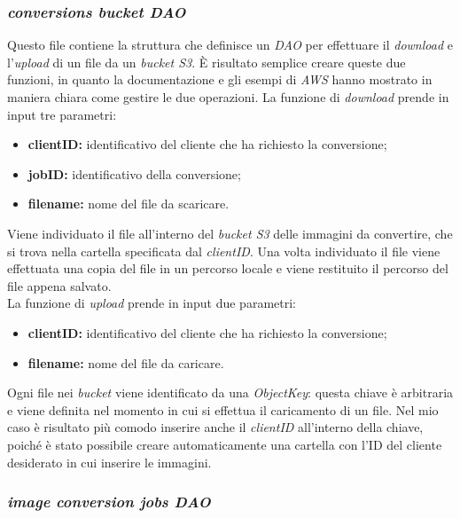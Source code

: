 \subsubsection{\emph{conversions bucket DAO}}

Questo file contiene la struttura che definisce un \emph{DAO} per effettuare il
\emph{download} e l'\emph{upload} di un file da un \emph{bucket S3}. È risultato
semplice creare queste due funzioni, in quanto la documentazione e gli esempi di
\emph{AWS} hanno mostrato in maniera chiara come gestire le due operazioni. La funzione
di \emph{download} prende in input tre parametri:
\begin{itemize}
      \item \textbf{clientID:} identificativo del cliente che ha richiesto la
            conversione;
      \item \textbf{jobID:} identificativo della conversione;
      \item \textbf{filename:} nome del file da scaricare.
\end{itemize}

Viene individuato il file all'interno del \emph{bucket S3} delle immagini da convertire, che si trova nella
cartella specificata dal \emph{clientID}. Una volta individuato il file viene effettuata una
copia del file in un percorso locale e viene restituito il percorso del file
appena salvato.\\

La funzione di \emph{upload} prende in input due parametri:
\begin{itemize}
      \item \textbf{clientID:} identificativo del cliente che ha richiesto la
            conversione;
      \item \textbf{filename:} nome del file da caricare.
\end{itemize}
Ogni file nei \emph{bucket} viene
identificato da una \emph{ObjectKey}: questa chiave è arbitraria e viene
definita nel momento in cui si effettua il caricamento di un file. Nel mio
caso è risultato più comodo inserire anche il \emph{clientID} all'interno della chiave,
poiché è stato possibile creare automaticamente una cartella con l'ID del cliente desiderato
in cui inserire le immagini. \\

\subsubsection{\emph{image conversion jobs DAO}}

